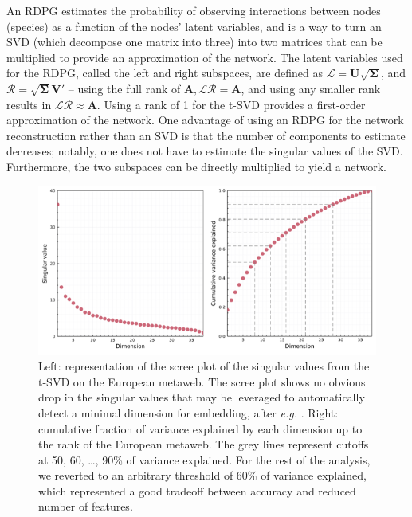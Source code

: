 An RDPG estimates the probability of observing interactions between
nodes (species) as a function of the nodes' latent variables, and is a
way to turn an SVD (which decompose one matrix into three) into two
matrices that can be multiplied to provide an approximation of the
network. The latent variables used for the RDPG, called the left and
right subspaces, are defined as
$\mathscr{L} = \mathbf{U}\sqrt{\mathbf{\Sigma}}$, and
$\mathscr{R} = \sqrt{\mathbf{\Sigma}}\mathbf{V}'$ -- using the full
rank of $\mathbf{A}, \mathscr{L}\mathscr{R} = \mathbf{A}$, and
using any smaller rank results in
$\mathscr{L}\mathscr{R} \approx \mathbf{A}$. Using a rank of 1 for the
t-SVD provides a first-order approximation of the network. One advantage
of using an RDPG for the network reconstruction rather than an SVD is
that the number of components to estimate decreases; notably, one does
not have to estimate the singular values of the SVD. Furthermore, the
two subspaces can be directly multiplied to yield a network.

\begin{figure}[h]
    \centering
    \includegraphics[width=\textwidth]{figures/figure-screeplot.png}
    \caption{Left: representation of the scree plot of the singular values
from the t-SVD on the European metaweb. The scree plot shows no obvious
drop in the singular values that may be leveraged to automatically
detect a minimal dimension for embedding, after \emph{e.g.}
\cite{Zhu2006AutDim}. Right: cumulative fraction of variance explained by each
dimension up to the rank of the European metaweb. The grey lines
represent cutoffs at 50, 60, \ldots, 90\% of variance explained. For the
rest of the analysis, we reverted to an arbitrary threshold of 60\% of
variance explained, which represented a good tradeoff between accuracy
and reduced number of features.}
    \label{fig:scree}
\end{figure}


